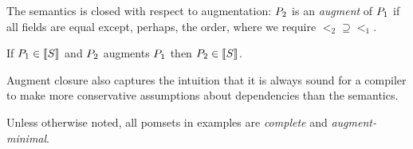 The semantics is closed with respect to {augmentation:} $P_2$ is an
\emph{augment} of $P_1$ if all fields are equal except, perhaps, the
order, where we require ${\lt_2}\supseteq{\lt_1}$.  
\begin{lemma}
  If $\aPS_1\in\sembase{\aCmd}$ and $P_2$  augments $P_1$ then $\aPS_2\in\sembase{\aCmd}$.

\end{lemma}
Augment closure also captures the intuition that it
is always sound for a compiler to make more conservative assumptions about
dependencies than the semantics.

Unless otherwise noted,
all pomsets in examples are \emph{complete} and
\emph{augment-minimal}. %


